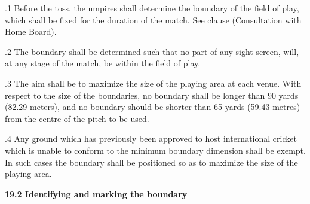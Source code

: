 \documentclass[12pt]{article}
\begin{document}
\vspace{\baselineskip}
\begin{adjustwidth}{0.5in}{0.24in}
{\fontsize{9pt}{10.8pt}.1 \tabto{0.49in} Before the toss, the umpires shall determine the boundary of the field of play, which shall be fixed for the duration of the match. See clause (Consultation with Home Board).\par}\par

\end{adjustwidth}


\vspace{\baselineskip}
\begin{adjustwidth}{0.5in}{0.12in}
{\fontsize{9pt}{10.8pt}.2 \tabto{0.49in} The boundary shall be determined such that no part of any sight-screen, will, at any stage of the match, be within the field of play.\par}\par

\end{adjustwidth}


\vspace{\baselineskip}
\begin{adjustwidth}{0.5in}{0.12in}
{\fontsize{9pt}{10.8pt}.3 \tabto{0.49in} The aim shall be to maximize the size of the playing area at each venue. With respect to the size of the boundaries, no boundary shall be longer than 90 yards (82.29 meters), and no boundary should be shorter than 65 yards (59.43 metres) from the centre of the pitch to be used.\par}\par

\end{adjustwidth}


\vspace{\baselineskip}
\begin{adjustwidth}{0.5in}{0.07in}
{\fontsize{9pt}{10.8pt}.4 \tabto{0.49in} Any ground which has previously been approved to host international cricket which is unable to conform to the minimum boundary dimension shall be exempt. In such cases the boundary shall be positioned so as to maximize the size of the playing area.\par}\par

\end{adjustwidth}


\vspace{\baselineskip}
{\fontsize{11pt}{13.2pt}\selectfont \textbf{19.2 \tabto{0.47in} Identifying and marking the boundary}\par}\par
\end{document}
